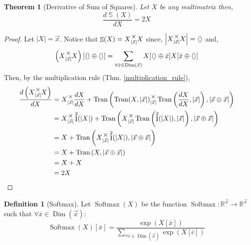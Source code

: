 \documentclass[12pt]{book}
\theoremstyle{plain}
\newtheorem{theorem}{Theorem}[chapter]
\theoremstyle{definition}
\newtheorem{definition}{Definition}[chapter]
\theoremstyle{ppart}
\theoremstyle{case}
\theoremstyle{solution}
\DeclareMathOperator{\Dim}{Dim}
\DeclareMathOperator{\Ident}{I}
\DeclareMathOperator{\Tran}{Tran}
\DeclareMathOperator{\SoS}{\mathbb{S}}
\DeclareMathOperator{\Softmax}{Softmax}
\newcommand{\mmult}[1]{\text{\raisebox{1ex}{$\underset{#1}{\times}$}}}
\newcommand{\shape}[1]{\left|#1\right|}
\begin{document}
\begin{theorem}[Derivative of Sum of Squares]
Let $X$ be any multimatrix then,
\[ \frac{d \SoS(X)}{dX} = 2X \]
\end{theorem}
\begin{proof}
Let $\shape{X} = \vec{x}$. Notice that $\SoS(X) = X \mmult{\shape{\vec{x}}} X$ since,
$\shape{X \mmult{\shape{\vec{x}}} X} = \left<\right>$ and,
\[
  \left(X \mmult{\shape{\vec{x}}} X\right)[\left<\right> \oplus \left<\right>]
  =
  \sum_{\forall \bar{x} \in \Dim(\vec{x})}
    X[\left<\right> \oplus \bar{x}]
    X[\bar{x} \oplus \left<\right>]
\]
Then, by the multiplication rule (Thm. \ref{multiplication_rule}),
\begin{align*}
  \frac{d\left(X \mmult{\shape{\vec{x}}} X\right)}{dX}
  &=
  X \mmult{\shape{\vec{x}}} \frac{dX}{dX} +
  \Tran\left(
    \Tran(X, \shape{\vec{x}})
      \mmult{\shape{\vec{x}}}
    \Tran\left(\frac{dX}{dX}, \shape{\vec{x}}\right),
    \shape{\vec{x} \oplus \vec{x}}
  \right) \\
  &=
  X \mmult{\shape{\vec{x}}} \Ident^2(\shape{X}) +
  \Tran\left(
    X
      \mmult{\shape{\vec{x}}}
    \Tran\left(\Ident^2(\shape{X}), \shape{\vec{x}}\right),
    \shape{\vec{x} \oplus \vec{x}}
  \right) \\
  &=
  X +
  \Tran\left(
    X
      \mmult{\shape{\vec{x}}}
    \Ident^2(\shape{X}),
    \shape{\vec{x} \oplus \vec{x}}
  \right) \\
  &=
  X +
  \Tran\left(
    X,
    \shape{\vec{x} \oplus \vec{x}}
  \right) \\
  &= X + X \\
  &= 2X
\end{align*}
\end{proof}

\begin{definition}[Softmax]
Let $\Softmax(X)$ be the function
$\Softmax : \mathbb{R}^{\vec{x}} \to \mathbb{R}^{\vec{x}}$
such that $\forall \bar{x} \in \Dim(\vec{x}):$
\[
  \Softmax(X)[\bar{x}] = \frac{
		\exp(X[\bar{x}])
	}{
		\sum_{\forall \bar{c} \in \Dim(\vec{x})} \exp(X[\bar{c}])
	}
\]
\end{definition}
\end{document}
